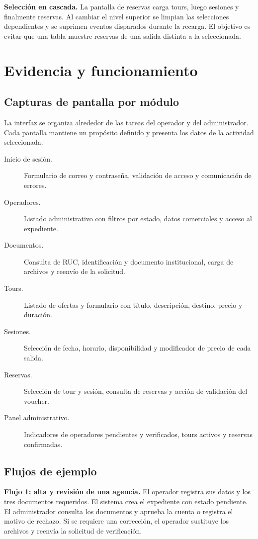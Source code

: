 \textbf{Selección en cascada.} La pantalla de reservas carga tours, luego sesiones y finalmente reservas. Al cambiar el nivel superior se limpian las selecciones dependientes y se suprimen eventos disparados durante la recarga. El objetivo es evitar que una tabla muestre reservas de una salida distinta a la seleccionada.

\section{Evidencia y funcionamiento}
\subsection{Capturas de pantalla por módulo}
La interfaz se organiza alrededor de las tareas del operador y del administrador. Cada pantalla mantiene un propósito definido y presenta los datos de la actividad seleccionada:
\begin{description}
\item[Inicio de sesión.] Formulario de correo y contraseña, validación de acceso y comunicación de errores.
\item[Operadores.] Listado administrativo con filtros por estado, datos comerciales y acceso al expediente.
\item[Documentos.] Consulta de RUC, identificación y documento institucional, carga de archivos y reenvío de la solicitud.
\item[Tours.] Listado de ofertas y formulario con título, descripción, destino, precio y duración.
\item[Sesiones.] Selección de fecha, horario, disponibilidad y modificador de precio de cada salida.
\item[Reservas.] Selección de tour y sesión, consulta de reservas y acción de validación del voucher.
\item[Panel administrativo.] Indicadores de operadores pendientes y verificados, tours activos y reservas confirmadas.
\end{description}

\subsection{Flujos de ejemplo}
\textbf{Flujo 1: alta y revisión de una agencia.} El operador registra sus datos y los tres documentos requeridos. El sistema crea el expediente con estado pendiente. El administrador consulta los documentos y aprueba la cuenta o registra el motivo de rechazo. Si se requiere una corrección, el operador sustituye los archivos y reenvía la solicitud de verificación.

